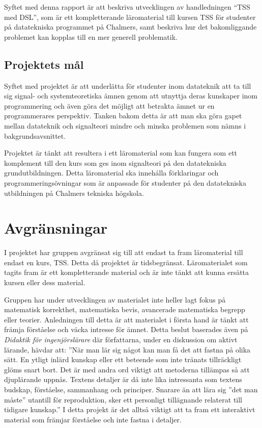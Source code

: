 \documentclass[]{article}
\begin{document}

Syftet med denna rapport är att beskriva utvecklingen av handledningen
``TSS med DSL'', som är ett kompletterande läromaterial till kursen TSS
för studenter på datatekniska programmet på Chalmers,
samt beskriva hur det bakomliggande problemet kan kopplas till en mer
generell problematik.

\subsection{Projektets mål}
Syftet med projektet är att underlätta för studenter inom datateknik att
ta till sig signal- och systemteoretiska ämnen genom att utnyttja deras
kunskaper inom programmering och även göra det möjligt att betrakta ämnet ur
en programmerares perspektiv. Tanken bakom detta är att man ska göra gapet
mellan datateknik och signalteori mindre och minska problemen som nämns
i bakgrundsavsnittet.

Projektet är tänkt att resultera i ett läromaterial som kan fungera som ett
komplement till den kurs som ges inom signalteori på den datatekniska
grundutbildningen. Detta läromaterial ska innehålla förklaringar och
programmeringsövningar som är anpassade för studenter på den datatekniska
utbildningen på Chalmers tekniska högskola.

\section{Avgränsningar}

I projektet har gruppen avgränsat sig till att endast ta fram läromaterial
till endast en kurs, TSS. Detta då projektet är tidsbegränsat.
Läromaterialet som tagits fram är ett kompletterande material och är inte
tänkt att kunna ersätta kursen eller dess material.

Gruppen har under utvecklingen av materialet inte heller lagt fokus på matematisk korrekthet, 
matematiska bevis, avancerade matematiska begrepp eller teorier.  Anledningen till detta är att 
materialet  i första hand är tänkt att främja förståelse och väcka intresse för ämnet. Detta beslut 
baserades även på \textit{Didaktik för ingenjörslärare} där författarna, under en diskussion om aktivt lärande, 
hävdar att: ”När man lär sig något kan man få det att fastna på olika sätt. En ytligt inlärd kunskap 
eller ett beteende som inte tränats tillräckligt glöms snart bort. Det är med andra ord viktigt att 
metoderna tillämpas så att djuplärande uppnås. Textens detaljer är då inte lika intressanta som textens 
budskap, förståelse, sammanhang och principer. Snarare än att lära sig ”det man måste” utantill för 
reproduktion, sker ett personligt tillägnande relaterat till tidigare kunskap.” I detta projekt är det 
alltså viktigt att ta fram ett interaktivt material som främjar förståelse och inte fastna i detaljer. 
\end{document}
